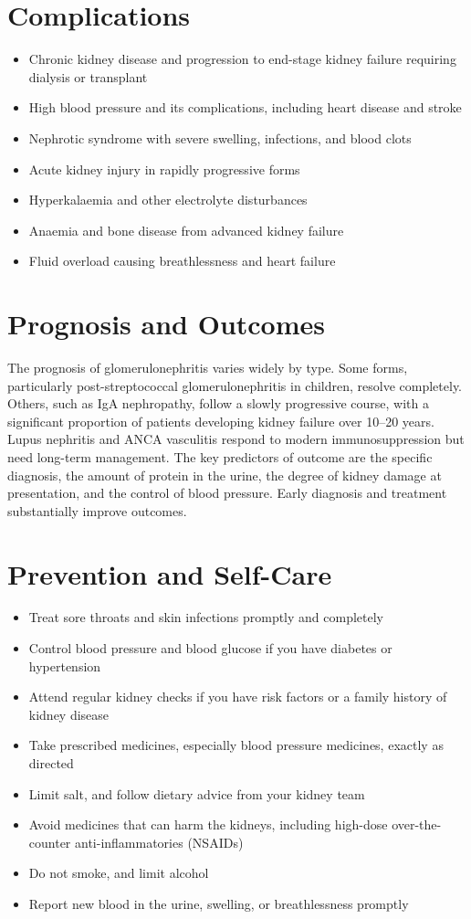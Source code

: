 \section*{Complications}
\begin{itemize}
    \item Chronic kidney disease and progression to end-stage kidney failure requiring dialysis or transplant
    \item High blood pressure and its complications, including heart disease and stroke
    \item Nephrotic syndrome with severe swelling, infections, and blood clots
    \item Acute kidney injury in rapidly progressive forms
    \item Hyperkalaemia and other electrolyte disturbances
    \item Anaemia and bone disease from advanced kidney failure
    \item Fluid overload causing breathlessness and heart failure
\end{itemize}

\section*{Prognosis and Outcomes}
The prognosis of glomerulonephritis varies widely by type. Some forms, particularly post-streptococcal glomerulonephritis in children, resolve completely. Others, such as IgA nephropathy, follow a slowly progressive course, with a significant proportion of patients developing kidney failure over 10--20 years. Lupus nephritis and ANCA vasculitis respond to modern immunosuppression but need long-term management. The key predictors of outcome are the specific diagnosis, the amount of protein in the urine, the degree of kidney damage at presentation, and the control of blood pressure. Early diagnosis and treatment substantially improve outcomes.

\section*{Prevention and Self-Care}
\begin{itemize}
    \item Treat sore throats and skin infections promptly and completely
    \item Control blood pressure and blood glucose if you have diabetes or hypertension
    \item Attend regular kidney checks if you have risk factors or a family history of kidney disease
    \item Take prescribed medicines, especially blood pressure medicines, exactly as directed
    \item Limit salt, and follow dietary advice from your kidney team
    \item Avoid medicines that can harm the kidneys, including high-dose over-the-counter anti-inflammatories (NSAIDs)
    \item Do not smoke, and limit alcohol
    \item Report new blood in the urine, swelling, or breathlessness promptly
\end{itemize}

